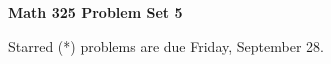 \documentclass[12pt]{article}
\begin{document}
\def\ctln{\centerline}
\def\msk{\medskip}
\def\bsk{\bigskip}
\def\ssk{\smallskip}
\def\hsk{\hskip.3in}
\def\ra{\rightarrow}
\def\ubr{\underbar}
\def\dsp{\displaystyle}

\def\mt{{\mathcal T}}
\def\mb{{\mathcal B}}
\def\ms{{\mathcal S}}
\def\mu{{\mathcal U}}
\def\mv{{\mathcal V}}

\def\bbr{{\mathbb R}}
\def\bbz{{\mathbb Z}}
\def\bbq{{\mathbb Q}}
\def\bbn{{\mathbb N}}
\def\spc{$~$\hskip.15in$~$}

\def\sset{\subseteq}
\def\del{\partial}
\def\lra{$\Leftrightarrow$}
\def\bra{$\Rightarrow$}




\ctln{\bf Math 325 Problem Set 5}

\msk

\ctln{Starred (*) problems are due Friday, September 28.}
\end{document}
